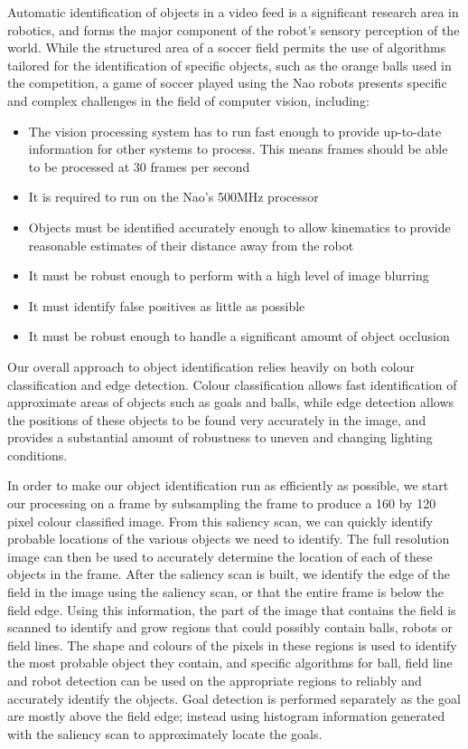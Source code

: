 \documentclass[pdftex,11pt,a4paper]{report}
\begin{document}
Automatic identification of objects in a video feed is a significant research area in robotics, and forms the major component of the robot's sensory perception of the world. While the structured area of a soccer field permits the use of algorithms tailored for the identification of specific objects, such as the orange balls used in the competition, a game of soccer played using the Nao robots presents specific and complex challenges in the field of computer vision, including: \begin{itemize}
\item{The vision processing system has to run fast enough to provide up-to-date information for other systems to process. This means frames should be able to be processed at 30 frames per second}
\item{It is required to run on the Nao's 500MHz processor}
\item{Objects must be identified accurately enough to allow kinematics to provide reasonable estimates of their distance away from the robot}
\item{It must be robust enough to perform with a high level of image blurring}
\item{It must identify false positives as little as possible}
\item{It must be robust enough to handle a significant amount of object occlusion}
\end{itemize}

Our overall approach to object identification relies heavily on both colour classification and edge detection. Colour classification allows fast identification of approximate areas of objects such as goals and balls, while edge detection allows the positions of these objects to be found very accurately in the image, and provides a substantial amount of robustness to uneven and changing lighting conditions. 

In order to make our object identification run as efficiently as possible, we start our processing on a frame by subsampling the frame to produce a 160 by 120 pixel colour classified image. From this saliency scan, we can quickly identify probable locations of the various objects we need to identify. The full resolution image can then be used to accurately determine the location of each of these objects in the frame. After the saliency scan is built, we identify the edge of the field in the image using the saliency scan, or that the entire frame is below the field edge. Using this information, the part of the image that contains the field is scanned to identify and grow regions that could possibly contain balls, robots or field lines. The shape and colours of the pixels in these regions is used to identify the most probable object they contain, and specific algorithms for ball, field line and robot detection can be used on the appropriate regions to reliably and accurately identify the objects. Goal detection is performed separately as the goal are mostly above the field edge; instead using histogram information generated with the saliency scan to approximately locate the goals. 
\end{document}
